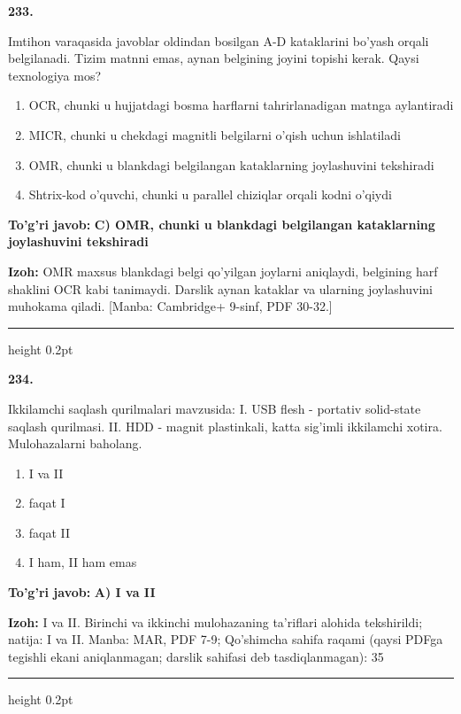 \documentclass[10pt,a4paper]{article}
\begin{document}
{\bfseries\sffamily\color{ink} 233.}
\par
Imtihon varaqasida javoblar oldindan bosilgan A-D kataklarini bo'yash orqali belgilanadi. Tizim matnni emas, aynan belgining joyini topishi kerak. Qaysi texnologiya mos?
\begin{enumerate}[label=\Alph*),leftmargin=9mm]
\item OCR, chunki u hujjatdagi bosma harflarni tahrirlanadigan matnga aylantiradi
\item MICR, chunki u chekdagi magnitli belgilarni o'qish uchun ishlatiladi
\item OMR, chunki u blankdagi belgilangan kataklarning joylashuvini tekshiradi
\item Shtrix-kod o'quvchi, chunki u parallel chiziqlar orqali kodni o'qiydi
\end{enumerate}
\begin{tcolorbox}[enhanced,breakable,colback=teal!4,colframe=teal!60!black,boxrule=0.45pt,arc=1.2mm,left=2.7mm,right=2.7mm,top=1.8mm,bottom=1.8mm,before skip=2mm,after skip=2mm]
{\bfseries\sffamily\color{teal}To'g'ri javob:} \textbf{C) OMR, chunki u blankdagi belgilangan kataklarning joylashuvini tekshiradi}
\par\smallskip
{\bfseries Izoh:} OMR maxsus blankdagi belgi qo'yilgan joylarni aniqlaydi, belgining harf shaklini OCR kabi tanimaydi. Darslik aynan kataklar va ularning joylashuvini muhokama qiladi. [Manba: Cambridge+ 9-sinf, PDF 30-32.]
\end{tcolorbox}
\vspace{2mm}\hrule height 0.2pt\vspace{3mm}

{\bfseries\sffamily\color{ink} 234.}
\par
Ikkilamchi saqlash qurilmalari mavzusida: I. USB flesh - portativ solid-state saqlash qurilmasi. II. HDD - magnit plastinkali, katta sig'imli ikkilamchi xotira. Mulohazalarni baholang.
\begin{enumerate}[label=\Alph*),leftmargin=9mm]
\item I va II
\item faqat I
\item faqat II
\item I ham, II ham emas
\end{enumerate}
\begin{tcolorbox}[enhanced,breakable,colback=teal!4,colframe=teal!60!black,boxrule=0.45pt,arc=1.2mm,left=2.7mm,right=2.7mm,top=1.8mm,bottom=1.8mm,before skip=2mm,after skip=2mm]
{\bfseries\sffamily\color{teal}To'g'ri javob:} \textbf{A) I va II}
\par\smallskip
{\bfseries Izoh:} I va II. Birinchi va ikkinchi mulohazaning ta'riflari alohida tekshirildi; natija: I va II. Manba: MAR, PDF 7-9; Qo'shimcha sahifa raqami (qaysi PDFga tegishli ekani aniqlanmagan; darslik sahifasi deb tasdiqlanmagan): 35
\end{tcolorbox}
\vspace{2mm}\hrule height 0.2pt\vspace{3mm}
\end{document}
